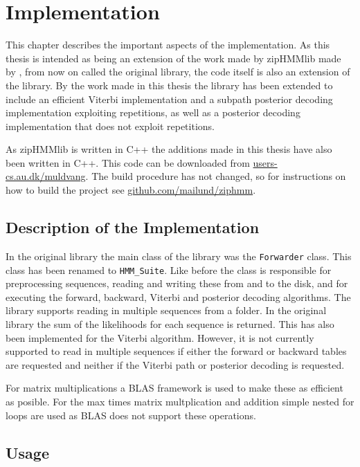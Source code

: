 
\chapter{Implementation}
\label{cha:implementation}

This chapter describes the important aspects of the implementation.  As this
thesis is intended as being an extension of the work made by zipHMMlib made by
\citet{sand2013ziphmmlib}, from now on called the original library, the code
itself is also an extension of the library.  By the work made in this thesis
the library has been extended to include an efficient Viterbi implementation
and a subpath posterior decoding implementation exploiting repetitions, as well
as a posterior decoding implementation that does not exploit repetitions.

As zipHMMlib is written in C++ the additions made in this thesis have also been
written in C++.  This code can be downloaded from
\url{users-cs.au.dk/muldvang}.   The build procedure has not
changed, so for instructions on how to build the project see
\url{github.com/mailund/ziphmm}.

\section{Description of the Implementation}

In the original library the main class of the library was the
\texttt{Forwarder} class.  This class has been renamed to \texttt{HMM\_Suite}.
Like before the class is responsible for preprocessing sequences, reading and
writing these from and to the disk, and for executing the forward, backward,
Viterbi and posterior decoding algorithms.  The library supports reading in
multiple sequences from a folder.  In the original library the sum of the
likelihoods for each sequence is returned.  This has also been implemented for
the Viterbi algorithm.  However, it is not currently supported to read in
multiple sequences if either the forward or backward tables are requested and
neither if the Viterbi path or posterior decoding is requested.

For matrix multiplications a BLAS framework is used to make these as efficient
as posible.  For the max times matrix multplication and addition simple nested
for loops are used as BLAS does not support these operations.

\section{Usage}

